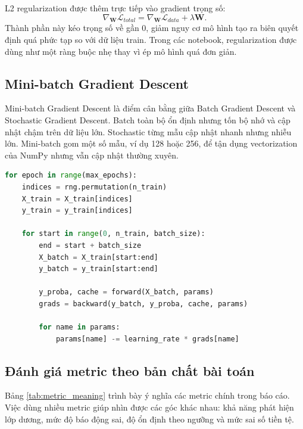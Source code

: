 \documentclass[12pt,a4paper]{report}
\begin{document}
L2 regularization được thêm trực tiếp vào gradient trọng số:
\begin{equation}
    \nabla_{\mathbf{W}}\mathcal{L}_{total}
    =
    \nabla_{\mathbf{W}}\mathcal{L}_{data}
    +
    \lambda \mathbf{W}.
\end{equation}
Thành phần này kéo trọng số về gần 0, giảm nguy cơ mô hình tạo ra biên quyết định quá phức tạp so với dữ liệu train.
Trong các notebook, regularization được dùng như một ràng buộc nhẹ thay vì ép mô hình quá đơn giản.

\subsection{Mini-batch Gradient Descent}
Mini-batch Gradient Descent là điểm cân bằng giữa Batch Gradient Descent và Stochastic Gradient Descent.
Batch toàn bộ ổn định nhưng tốn bộ nhớ và cập nhật chậm trên dữ liệu lớn.
Stochastic từng mẫu cập nhật nhanh nhưng nhiễu lớn.
Mini-batch gom một số mẫu, ví dụ 128 hoặc 256, để tận dụng vectorization của NumPy nhưng vẫn cập nhật thường xuyên.

\begin{lstlisting}[language=Python, caption={Vòng lặp mini-batch gradient descent}, label={lst:minibatch}]
for epoch in range(max_epochs):
    indices = rng.permutation(n_train)
    X_train = X_train[indices]
    y_train = y_train[indices]

    for start in range(0, n_train, batch_size):
        end = start + batch_size
        X_batch = X_train[start:end]
        y_batch = y_train[start:end]

        y_proba, cache = forward(X_batch, params)
        grads = backward(y_batch, y_proba, cache, params)

        for name in params:
            params[name] -= learning_rate * grads[name]
\end{lstlisting}

\subsection{Đánh giá metric theo bản chất bài toán}
Bảng \ref{tab:metric_meaning} trình bày ý nghĩa các metric chính trong báo cáo.
Việc dùng nhiều metric giúp nhìn được các góc khác nhau: khả năng phát hiện lớp dương, mức độ báo động sai, độ ổn định theo ngưỡng và mức sai số tiền tệ.
\end{document}
